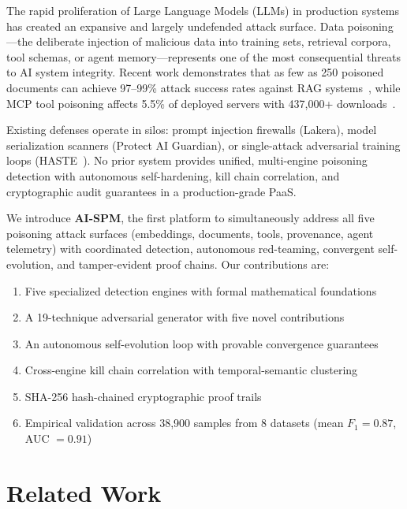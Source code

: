 \documentclass[11pt,twocolumn]{article}
\begin{document}
The rapid proliferation of Large Language Models (LLMs) in production systems has created an expansive and largely undefended attack surface. Data poisoning---the deliberate injection of malicious data into training sets, retrieval corpora, tool schemas, or agent memory---represents one of the most consequential threats to AI system integrity. Recent work demonstrates that as few as 250 poisoned documents can achieve 97--99\% attack success rates against RAG systems~\cite{poisonedrag}, while MCP tool poisoning affects 5.5\% of deployed servers with 437,000+ downloads~\cite{adversa_mcp}.

Existing defenses operate in silos: prompt injection firewalls (Lakera), model serialization scanners (Protect AI Guardian), or single-attack adversarial training loops (HASTE~\cite{haste}). No prior system provides unified, multi-engine poisoning detection with autonomous self-hardening, kill chain correlation, and cryptographic audit guarantees in a production-grade PaaS.

We introduce \textbf{AI-SPM}, the first platform to simultaneously address all five poisoning attack surfaces (embeddings, documents, tools, provenance, agent telemetry) with coordinated detection, autonomous red-teaming, convergent self-evolution, and tamper-evident proof chains. Our contributions are:

\begin{enumerate}[leftmargin=*,noitemsep]
  \item Five specialized detection engines with formal mathematical foundations
  \item A 19-technique adversarial generator with five novel contributions
  \item An autonomous self-evolution loop with provable convergence guarantees
  \item Cross-engine kill chain correlation with temporal-semantic clustering
  \item SHA-256 hash-chained cryptographic proof trails
  \item Empirical validation across 38,900 samples from 8 datasets (mean $F_1 = 0.87$, AUC $= 0.91$)
\end{enumerate}

\section{Related Work}
\label{sec:related}
\end{document}
